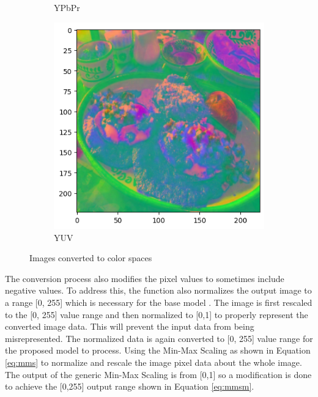 \begin{figure}[htbp]
\begin{subfigure}[b]{0.22\textwidth}
    \caption{YPbPr}
    \label{fig:ypbpr}
  \end{subfigure}
  \hfill
  \begin{subfigure}[b]{0.22\textwidth}
    \includegraphics[width=\textwidth]{graphics/images/colorspaces/yuv.png}
    \caption{YUV}
    \label{fig:yuv}
  \end{subfigure}
 
  \caption{Images converted to color spaces}
  \label{fig:colorspaces}
\end{figure}

The conversion process also modifies the pixel values to sometimes include negative values. To address this, the function also normalizes the output image to a range [0, 255] which is necessary for the base model \cite{gangan-2022}. The image is first rescaled to the [0, 255] value range and then normalized to [0,1] to properly represent the converted image data. This will prevent the input data from being misrepresented. The normalized data is again converted to [0, 255] value range for the proposed model to process. Using the Min-Max Scaling as shown in Equation \ref{eq:mms} to normalize and rescale the image pixel data about the whole image. The output of the generic Min-Max Scaling is from [0,1] so a modification is done to achieve the [0,255] output range shown in Equation \ref{eq:mmsm}.

